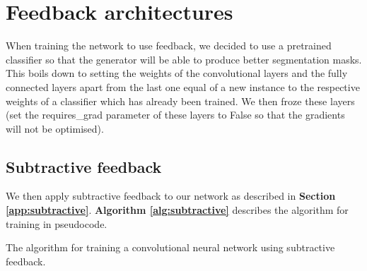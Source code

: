 \documentclass{l4proj}
\begin{document}
\section{Feedback architectures}
When training the network to use feedback, we decided to use a pretrained classifier so that the generator will be able to produce better segmentation masks. This boils down to setting the weights of the convolutional layers and the fully connected layers apart from the last one equal of a new instance to the respective weights of a classifier which has already been trained. We then froze these layers (set the requires\_grad parameter of these layers to False so that the gradients will not be optimised).

\subsection{Subtractive feedback}
\label{implsubtr}
We then apply subtractive feedback to our network as described in \textbf{Section {\ref{app:subtractive}}}.
\textbf{Algorithm \ref{alg:subtractive}} describes the algorithm for training in pseudocode.

\begin{algorithm}
    \DontPrintSemicolon
    \CommentSty{\color{black}}
    
\caption{The algorithm for training a convolutional neural network using subtractive feedback. }\label{alg:subtractive}
\end{algorithm}
\end{document}
